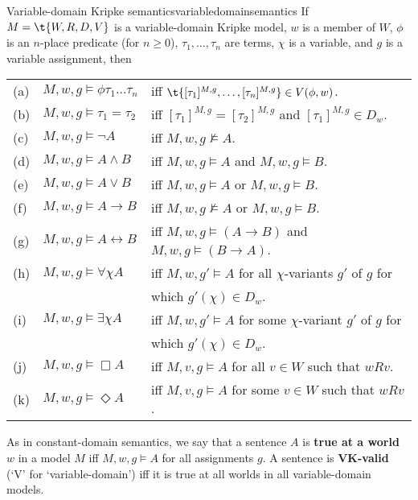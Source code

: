 \begin{definition}{Variable-domain Kripke semantics}{variabledomainsemantics}
  If $\Mfr = \t{W,R,D,V}$ is a variable-domain Kripke model, $w$ is a member of
  $W$, $\phi$ is an $n$-place predicate (for $n\geq 0$), $\tau_1,\ldots,\tau_n$
  are terms, $\chi$ is a variable, and $g$ is a variable assignment, then
  
  
  \medskip\hspace{-4mm}
  \begin{tabular}{lll}
    (a) & $M,w,g \models \phi \tau_1\ldots \tau_n$ &iff $\t{[\tau_1]^{M,g},\ldots,[\tau_n]^{M,g}} \in V(\phi,w)$.\\
    (b) & $M,w,g \models \tau_1=\tau_2$ &iff $[\tau_1]^{M,g} = [\tau_2]^{M,g}$ and $[\tau_1]^{M,g} \in D_w$.\\
    (c) & $M,w,g \models \neg A$ &iff $M,w,g \not\models A$.\\
    (d) & $M,w,g \models A \land B$ &iff $M,w,g \models A$ and $M,w,g \models B$.\\
    (e) & $M,w,g \models A \lor B$ &iff $M,w,g \models A$ or $M,w,g \models B$.\\
    (f) & $M,w,g \models A \to B$ &iff $M,w,g \not\models A$ or $M,w,g \models B$.\\
    (g) & $M,w,g \models A \leftrightarrow B$ &iff $M,w,g \models (A\to B)$ and $M,w,g \models (B\to A)$.\\
    (h) & $M,w,g \models \forall \chi A$ &iff $M,w,g' \models A$ for all $\chi$-variants $g'$ of $g$ for\\[-1mm]
        && which $g'(\chi)\in D_w$.\\
    (i) & $M,w,g \models \exists \chi A$ &iff $M,w,g' \models A$ for some $\chi$-variant $g'$ of $g$ for\\[-1mm]
        && which $g'(\chi)\in D_w$.\\
    (j) & $M,w,g \models \Box A$ &iff $M,v,g \models A$ for all $v\in W$ such that $wRv$.\\
    (k) & $M,w,g \models \Diamond A$ &iff $M,v,g \models A$ for some $v\in W$ such that $wRv$.
  \end{tabular}
\end{definition}

As in constant-domain semantics, we say that a sentence $A$ is \textbf{true at a
  world $w$} in a model $M$ iff $M,w,g \models A$ for all assignments $g$. A
sentence is \textbf{VK-valid} (`V' for `variable-domain') iff it is true at all
worlds in all variable-domain models.

